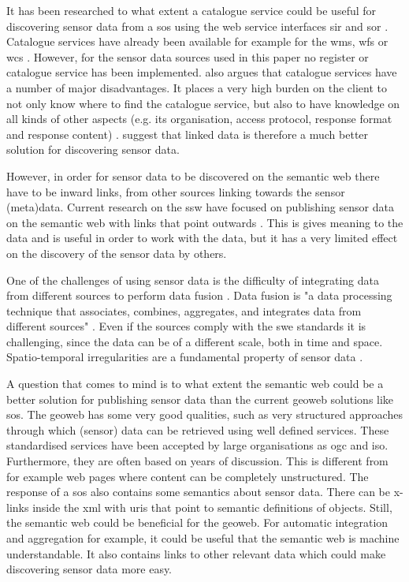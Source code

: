 It has been researched to what extent a catalogue service could be useful for discovering sensor data from a \ac{sos} using the web service interfaces \ac{sir} \citep{SW:OGC3} and \ac{sor} \citep{SW:OGC4}. Catalogue services have already been available for example for the \ac{wms}, \ac{wfs} or \ac{wcs} \citep{SDI:OGC2}. However, for the sensor data sources used in this paper no register or catalogue service has been implemented. \cite{SSW:Atkinson} also argues that catalogue services have a number of major disadvantages. It places a very high burden on the client to not only know where to find the catalogue service, but also to have knowledge on all kinds of other aspects (e.g. its organisation, access protocol, response format and response content) \cite[p. 128]{SSW:Atkinson}. \citeauthor{SSW:Atkinson} suggest that linked data is therefore a much better solution for discovering sensor data. 

However, in order for sensor data to be discovered on the semantic web there have to be inward links, from other sources linking towards the sensor (meta)data. Current research on the \ac{ssw} have focused on publishing sensor data on the semantic web with links that point outwards \citep{SSW:Atkinson, SSW:Janowicz, SSW:Pschorr}. This is gives meaning to the data and is useful in order to work with the data, but it has a very limited effect on the discovery of the sensor data by others. 

One of the challenges of using sensor data is the difficulty of integrating data from different sources to perform data fusion \citep{SSW:Corcho, SSW:Ji, SSW:Wang}. Data fusion is "a data processing technique that associates, combines, aggregates, and integrates data from different sources" \cite[p. 2]{SSW:Wang2}. Even if the sources comply with the \ac{swe} standards it is challenging, since the data can be of a different scale, both in time and space. Spatio-temporal irregularities are a fundamental property of sensor data \citep{SW:Ganesan}. 

A question that comes to mind is to what extent the semantic web could be a better solution for publishing sensor data than the current geoweb solutions like \ac{sos}. The geoweb has some very good qualities, such as very structured approaches through which (sensor) data can be retrieved using well defined services. These standardised services have been accepted by large organisations as \ac{ogc} and \ac{iso}. Furthermore, they are often based on years of discussion. This is different from for example web pages where content can be completely unstructured. The response of a \ac{sos} also contains some semantics about sensor data. There can be x-links inside the \ac{xml} with \ac{uri}s that point to semantic definitions of objects. Still, the semantic web could be beneficial for the geoweb. For automatic integration and aggregation for example, it could be useful that the semantic web is machine understandable. It also contains links to other relevant data which could make discovering sensor data more easy. 

